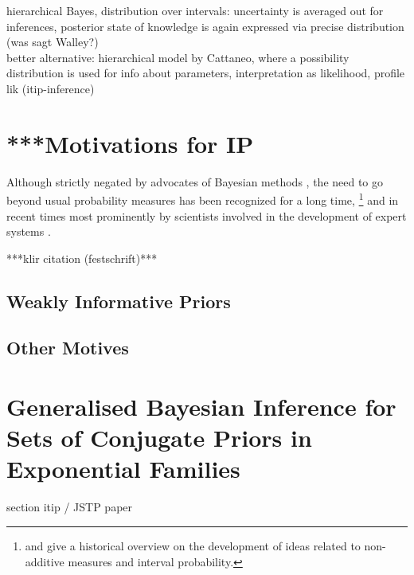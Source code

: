 hierarchical Bayes, distribution over intervals:
uncertainty is averaged out for inferences,
posterior state of knowledge is again expressed via precise distribution (was sagt Walley?)\\
better alternative: hierarchical model by Cattaneo,
where a possibility distribution is used for info about parameters,
interpretation as likelihood, profile lik (itip-inference)



\section{***Motivations for IP}
\label{sec:motivation}

Although strictly negated by advocates of Bayesian methods \parencite[e.g., by][]{1987:lindley},
the need to go beyond usual probability measures has been recognized for a long time,%
\footnote{\textcite{2009:hampel} and \textcite[\S 1]{2001:weichselberger} give a historical overview on the development of
ideas related to non-additive measures and interval probability.}
and in recent times most prominently by scientists involved in the development of expert systems \parencite{1996:walley::expert}.

***klir citation (festschrift)***

\subsection{\pdc }

\subsection{Weakly Informative Priors}
\label{sec:motivation:near-ignorance}

\subsection{Other Motives}


\section{Generalised Bayesian Inference for Sets of Conjugate Priors in Exponential Families}
\label{sec:imprecisebayes-conjugate}

section itip / JSTP paper



